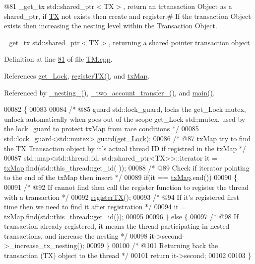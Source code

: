 @81 \+\_\+get\+\_\+tx std\+::shared\+\_\+ptr$<$\+T\+X$>$, return an trtansaction Object as a shared\+\_\+ptr, if \hyperlink{class_t_x}{TX} not exists then create and register.\# If the transaction Object exists then increasing the nesting level within the Transaction Object. 

\+\_\+get\+\_\+tx std\+::shared\+\_\+ptr$<$\+T\+X$>$, returning a shared pointer transaction object 

Definition at line \hyperlink{_t_m_8cpp_source_l00081}{81} of file \hyperlink{_t_m_8cpp_source}{T\+M.\+cpp}.



References \hyperlink{_t_m_8h_source_l00111}{get\+\_\+\+Lock}, \hyperlink{_t_m_8cpp_source_l00045}{register\+T\+X()}, and \hyperlink{_t_m_8h_source_l00091}{tx\+Map}.



Referenced by \hyperlink{main_8cpp_source_l00077}{\+\_\+nesting\+\_\+()}, \hyperlink{main_8cpp_source_l00032}{\+\_\+two\+\_\+account\+\_\+transfer\+\_\+()}, and \hyperlink{main_8cpp_source_l00142}{main()}.


\begin{DoxyCode}
00082 \{
00083    
00084     \textcolor{comment}{/* @85 guard std::lock\_guard, locks the get\_Lock mutex, unlock automatically when goes out of the scope
       get\_Lock std::mutex, used by the lock\_guard to protect txMap from race conditions */}
00085     std::lock\_guard<std::mutex> guard(\hyperlink{class_t_m_a123bc5aa0766a7b909bebc54a429e5b0_a123bc5aa0766a7b909bebc54a429e5b0}{get\_Lock});
00086     \textcolor{comment}{/* @87 txMap try to find the TX Transaction object by it's actual thread ID if registred in the txMap 
      */}
00087     std::map<std::thread::id, std::shared\_ptr<TX>>::iterator it = \hyperlink{class_t_m_a0333dfa193ea99d7626de74a2b932e9b_a0333dfa193ea99d7626de74a2b932e9b}{txMap}.find(std::this\_thread::get\_id(
      ));
00088     \textcolor{comment}{/* @89 Check if iterator pointing to the end of the txMap then insert */}
00089     \textcolor{keywordflow}{if}(it == \hyperlink{class_t_m_a0333dfa193ea99d7626de74a2b932e9b_a0333dfa193ea99d7626de74a2b932e9b}{txMap}.end())
00090     \{
00091       \textcolor{comment}{/* @92 If cannot find then call the register function to register the thread with a transaction */}
00092        \hyperlink{class_t_m_a26ea481c24d9aa3aebd6dafb7253376e_a26ea481c24d9aa3aebd6dafb7253376e}{registerTX}();
00093        \textcolor{comment}{/* @94 If it's registered first time then we need to find it after registration */}
00094        it = \hyperlink{class_t_m_a0333dfa193ea99d7626de74a2b932e9b_a0333dfa193ea99d7626de74a2b932e9b}{txMap}.find(std::this\_thread::get\_id());
00095        
00096     \} \textcolor{keywordflow}{else} \{
00097         \textcolor{comment}{/* @98 If transaction already registered, it means the thread participating in nested transactions,
       and increase the nesting */}
00098         it->second->\_increase\_tx\_nesting();
00099     \}
00100     \textcolor{comment}{/* @101 Returning back the transaction (TX) object to the thread */}
00101     \textcolor{keywordflow}{return} it->second;
00102 
00103 \}
\end{DoxyCode}



